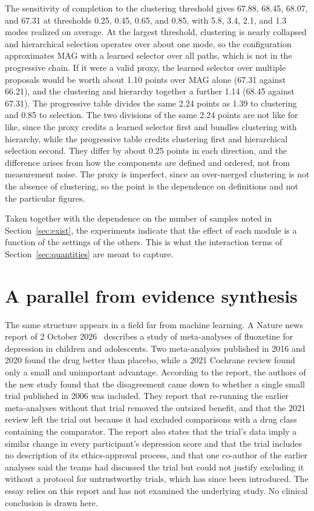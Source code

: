 \documentclass[11pt]{article}
\theoremstyle{plain}
\theoremstyle{remark}
\begin{document}
The sensitivity of completion to the clustering threshold gives 67.88, 68.45, 68.07, and 67.31 at thresholds 0.25, 0.45, 0.65, and 0.85, with 5.8, 3.4, 2.1, and 1.3 modes realized on average. At the largest threshold, clustering is nearly collapsed and hierarchical selection operates over about one mode, so the configuration approximates MAG with a learned selector over all paths, which is not in the progressive chain. If it were a valid proxy, the learned selector over multiple proposals would be worth about 1.10 points over MAG alone (67.31 against 66.21), and the clustering and hierarchy together a further 1.14 (68.45 against 67.31). The progressive table divides the same 2.24 points as 1.39 to clustering and 0.85 to selection. The two divisions of the same 2.24 points are not like for like, since the proxy credits a learned selector first and bundles clustering with hierarchy, while the progressive table credits clustering first and hierarchical selection second. They differ by about 0.25 points in each direction, and the difference arises from how the components are defined and ordered, not from measurement noise. The proxy is imperfect, since an over-merged clustering is not the absence of clustering, so the point is the dependence on definitions and not the particular figures.

Taken together with the dependence on the number of samples noted in Section~\ref{sec:exist}, the experiments indicate that the effect of each module is a function of the settings of the others. This is what the interaction terms of Section~\ref{sec:quantities} are meant to capture.

\section{A parallel from evidence synthesis}\label{sec:meta}

The same structure appears in a field far from machine learning. A Nature news report of 2 October 2026~\cite{vannoorden2026} describes a study of meta-analyses of fluoxetine for depression in children and adolescents. Two meta-analyses published in 2016 and 2020 found the drug better than placebo, while a 2021 Cochrane review found only a small and unimportant advantage. According to the report, the authors of the new study found that the disagreement came down to whether a single small trial published in 2006 was included. They report that re-running the earlier meta-analyses without that trial removed the outsized benefit, and that the 2021 review left the trial out because it had excluded comparisons with a drug class containing the comparator. The report also states that the trial's data imply a similar change in every participant's depression score and that the trial includes no description of its ethics-approval process, and that one co-author of the earlier analyses said the teams had discussed the trial but could not justify excluding it without a protocol for untrustworthy trials, which has since been introduced. The essay relies on this report and has not examined the underlying study. No clinical conclusion is drawn here.
\end{document}
